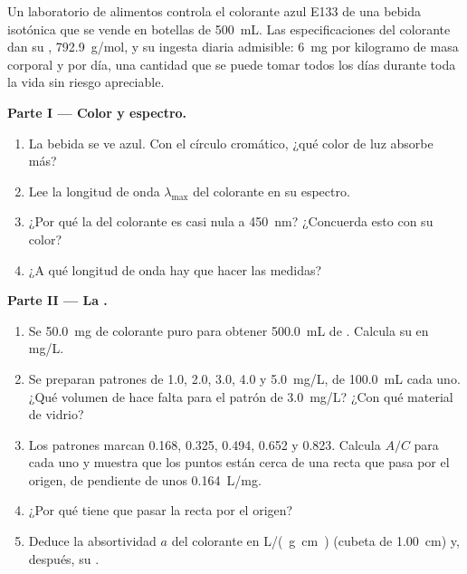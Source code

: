 \begin{problem}
\label{pb:g11:absorbance:1}
Un laboratorio de alimentos controla el colorante azul E133 de una
bebida isotónica que se vende en botellas de \qty{500}{mL}. Las
especificaciones del colorante dan su , \qty{792.9}{g/mol}, y
su ingesta diaria admisible: \qty{6}{mg} por kilogramo de masa corporal
y por día, una cantidad que se puede tomar todos los días durante toda
la vida sin riesgo apreciable.

\medskip
\noindent\textbf{Parte I --- Color y espectro.}
\begin{enumerate}
  \item La bebida se ve azul. Con el círculo cromático, ¿qué color de
        luz absorbe más?
  \item Lee la longitud de onda $\lambda_{\max}$ del colorante en su
        espectro.
  \item ¿Por qué la  del colorante es casi nula a
        \qty{450}{nm}? ¿Concuerda esto con su color?
  \item ¿A qué longitud de onda hay que hacer las medidas?
\end{enumerate}

\medskip
\noindent\textbf{Parte II --- La .}
\begin{enumerate}[resume]
  \item Se  \qty{50.0}{mg} de colorante puro para obtener
        \qty{500.0}{mL} de . Calcula su  en \si{mg/L}.
  \item Se preparan patrones de 1.0, 2.0, 3.0, 4.0 y \qty{5.0}{mg/L}, de
        \qty{100.0}{mL} cada uno. ¿Qué volumen de  hace
        falta para el patrón de \qty{3.0}{mg/L}? ¿Con qué material de
        vidrio?
  \item Los patrones marcan 0.168, 0.325, 0.494, 0.652 y 0.823. Calcula
        $A / C$ para cada uno y muestra que los puntos están cerca de
        una recta que pasa por el origen, de pendiente de unos
        \qty{0.164}{L/mg}.
  \item ¿Por qué tiene que pasar la recta por el origen?
  \item Deduce la absortividad $a$ del colorante en \si{L/(g.cm)}
        (cubeta de \qty{1.00}{cm}) y, después, su .
\end{enumerate}


\end{problem}

